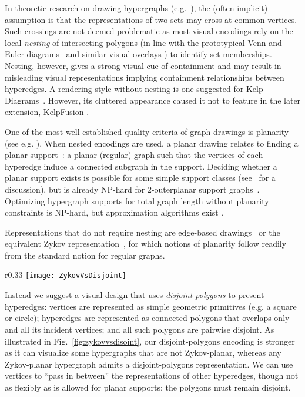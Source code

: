 \documentclass[runningheads]{llncs}
\begin{document}
In theoretic research on drawing hypergraphs (e.g.~\cite{Buchin2011,Kaufmann2009}), the (often implicit) assumption is that the representations of two sets may cross at common vertices.
Such crossings are not deemed problematic as most visual encodings rely on the local \emph{nesting} of intersecting polygons (in line with the prototypical Venn and Euler diagrams~\cite{Baron1969} and similar visual overlays \cite{Collins2009,Dinkla2012,Meulemans2013}) to identify set memberships.
Nesting, however, gives a strong visual cue of containment and may result in misleading visual representations implying containment relationships between hyperedges.
A rendering style without nesting is one suggested for Kelp Diagrams~\cite{Dinkla2012}.
However, its cluttered appearance caused it not to feature in the later extension, KelpFusion \cite{Meulemans2013}.

One of the most well-established quality criteria of graph drawings is planarity (see e.g. \cite{Purchase2002,Purchase1996}).
When nested encodings are used, a planar drawing relates to finding a planar support~\cite{Buchin2011}: a planar (regular) graph such that the vertices of each hyperedge induce a connected subgraph in the support.
Deciding whether a planar support exists is possible for some simple support classes (see~\cite{Buchin2011} for a discussion), but is already NP-hard for 2-outerplanar support graphs~\cite{Buchin2011}.
Optimizing hypergraph supports for total graph length without planarity constraints is
NP-hard, but approximation algorithms exist \cite{Akitaya2016,Hurtado2013}.

Representations that do not require nesting are edge-based drawings~\cite{Makinen1990} or the equivalent Zykov representation~\cite{Walsh1975}, for which notions of planarity follow readily from the standard notion for regular graphs.

\begin{wrapfigure}[13]{r}{0.33\linewidth}
  \centering
  \vspace{-0.8\intextsep}
  \texttt{[image: ZykovVsDisjoint]}
  \caption{A hypergraph that is not Zykov-planar (top) but has a disjoint-polygons drawing (bottom).}
  \label{fig:zykovvsdisoint}
\end{wrapfigure}

Instead we suggest a visual design that uses \emph{disjoint polygons} to present hyperedges: vertices are represented as simple geometric primitives (e.g. a square or circle); hyperedges are represented as connected polygons that overlaps only and all its incident vertices; and all such polygons are pairwise disjoint.
As illustrated in Fig.~\ref{fig:zykovvsdisoint}, our disjoint-polygons encoding is stronger as it can visualize some hypergraphs that are not Zykov-planar, whereas any Zykov-planar hypergraph admits a disjoint-polygons representation.
We can use vertices to ``pass in between'' the representations of other hyperedges, though not as flexibly as is allowed for planar supports: the polygons must remain disjoint.
\end{document}
